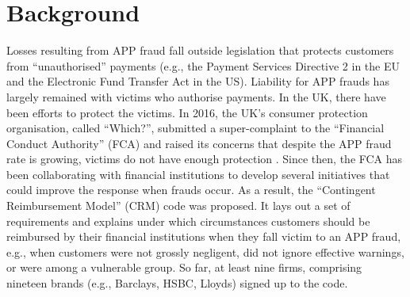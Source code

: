 

\vspace{-3.5 mm}

\section{Background}\label{sec::background}

\vspace{-1 mm}


Losses resulting from APP fraud fall outside legislation that protects customers from ``unauthorised'' payments (e.g., the Payment Services Directive 2 in the EU and the Electronic Fund Transfer Act in the US). Liability for  APP frauds has largely remained with victims who authorise payments. In the UK,  there have been efforts to protect the victims. In  2016, the UK's consumer protection organisation, called ``Which?'', submitted a super-complaint to the
 ``Financial Conduct Authority” (FCA) and raised its concerns that despite the APP fraud rate is growing, victims do not have enough protection \cite{Which?-super-complaint}.  Since then, the FCA has been collaborating with financial institutions to develop several initiatives that
could improve the response when frauds occur. As a result,  the ``Contingent Reimbursement Model'' (CRM)  code  \cite{CRM-code} was proposed. It lays out a set of requirements and explains under which circumstances customers should be reimbursed by their financial institutions when they fall victim to an APP fraud, e.g., when customers were not grossly negligent, did not ignore effective warnings, or were among a vulnerable group. So far,  at least nine firms, comprising nineteen brands (e.g., Barclays, HSBC,  Lloyds) signed up to the code. 


